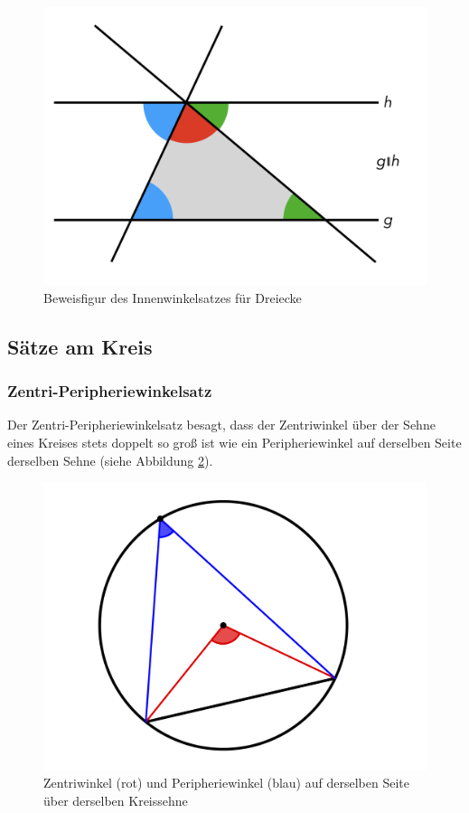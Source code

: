 \documentclass[
]{scrbook}
\theoremstyle{definition}
\theoremstyle{definition}
\theoremstyle{definition}
\theoremstyle{definition}
\theoremstyle{remark}
\begin{document}
\begin{figure}

{\centering \includegraphics[width=0.75\linewidth]{pictures/12-InnenwinkelBeweisfigur} 

}

\caption{Beweisfigur des Innenwinkelsatzes für Dreiecke}\label{fig:InnenwinkelBeweisfigure}
\end{figure}

\hypertarget{suxe4tze-am-kreis}{%
\subsection{Sätze am Kreis}\label{suxe4tze-am-kreis}}

\hypertarget{zentri-peripheriewinkelsatz}{%
\subsubsection{Zentri-Peripheriewinkelsatz}\label{zentri-peripheriewinkelsatz}}

Der Zentri-Peripheriewinkelsatz besagt, dass der Zentriwinkel über der Sehne eines Kreises stets doppelt so groß ist wie ein Peripheriewinkel auf derselben Seite derselben Sehne (siehe Abbildung \ref{fig:Zentri}).

\begin{figure}

{\centering \includegraphics[width=0.75\linewidth]{pictures/12-Zentri} 

}

\caption{Zentriwinkel (rot) und Peripheriewinkel (blau) auf derselben Seite über derselben Kreissehne}\label{fig:Zentri}
\end{figure}
\end{document}
